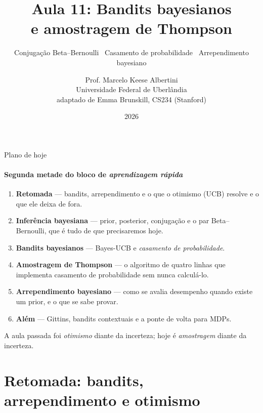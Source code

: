 \documentclass[aspectratio=169, 11pt]{beamer}
\title[Aula 11 — Bandits bayesianos]{Aula 11: Bandits bayesianos\\
  e amostragem de Thompson}
\subtitle[Aprendizagem por Reforço]{Conjugação Beta--Bernoulli \textbullet\ Casamento de
  probabilidade \textbullet\ Arrependimento bayesiano}
\author[Prof. Marcelo K. Albertini]{Prof. Marcelo Keese Albertini \\
  \footnotesize Universidade Federal de Uberlândia \\
  \footnotesize adaptado de Emma Brunskill, CS234 (Stanford)}
\institute{Universidade Federal de Uberlândia}
\date{2026}
\begin{document}
\begin{frame}\titlepage\end{frame}

\begin{frame}{Plano de hoje}
  \framesubtitle{Segunda metade do bloco de \emph{aprendizagem rápida}}
  \begin{enumerate}
    \item \textbf{Retomada} — bandits, arrependimento e o que o otimismo
          (UCB) resolve e o que ele deixa de fora.
    \item \textbf{Inferência bayesiana} — prior, posterior, conjugação e o
          par Beta--Bernoulli, que é tudo de que precisaremos hoje.
    \item \textbf{Bandits bayesianos} — Bayes-UCB e \emph{casamento de
          probabilidade}.
    \item \textbf{Amostragem de Thompson} — o algoritmo de quatro linhas
          que implementa casamento de probabilidade sem nunca calculá-lo.
    \item \textbf{Arrependimento bayesiano} — como se avalia desempenho
          quando existe um prior, e o que se sabe provar.
    \item \textbf{Além} — Gittins, bandits contextuais e a ponte de volta
          para MDPs.
  \end{enumerate}

  \smallskip
  {\small\color{rlCinza} A aula passada foi \emph{otimismo} diante da
  incerteza; hoje é \emph{amostragem} diante da incerteza.}
\end{frame}

\section{Retomada: bandits, arrependimento e otimismo}
\end{document}
